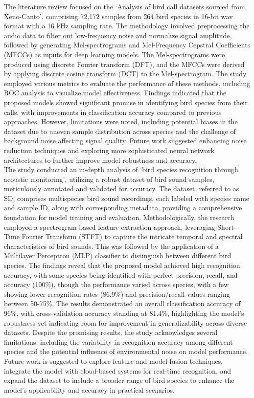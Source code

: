 The literature review focused on the `Analysis of bird call datasets sourced
from Xeno-Canto', comprising 72,172 samples from 264 bird species in 16-bit wav
format with a 16 kHz sampling rate. The methodology involved preprocessing the
audio data to filter out low-frequency noise and normalize signal amplitude,
followed by generating Mel-spectrograms and Mel-Frequency Cepstral Coefficients
(MFCCs) as inputs for deep learning models. The Mel-spectrograms were produced
using discrete Fourier transform (DFT), and the MFCCs were derived by applying
discrete cosine transform (DCT) to the Mel-spectrogram. The study employed
various metrics to evaluate the performance of these methods, including ROC
analysis to visualize model effectiveness. Findings indicated that the proposed
models showed significant promise in identifying bird species from their calls,
with improvements in classification accuracy compared to previous approaches.
However, limitations were noted, including potential biases in the dataset due
to uneven sample distribution across species and the challenge of background
noise affecting signal quality. Future work suggested enhancing noise reduction
techniques and exploring more sophisticated neural network architectures to
further improve model robustness and accuracy.\cite{wang2022efficient}\\

The study conducted an in-depth analysis of `bird species recognition through
acoustic monitoring', utilizing a robust dataset of bird sound samples,
meticulously annotated and validated for accuracy. The dataset, referred to as
SD, comprises multispecies bird sound recordings, each labeled with species
name and sample ID, along with corresponding metadata, providing a
comprehensive foundation for model training and evaluation. Methodologically,
the research employed a spectrogram-based feature extraction approach,
leveraging Short-Time Fourier Transform (STFT) to capture the intricate
temporal and spectral characteristics of bird sounds. This was followed by the
application of a Multilayer Perceptron (MLP) classifier to distinguish between
different bird species. The findings reveal that the proposed model achieved
high recognition accuracy, with some species being identified with perfect
precision, recall, and accuracy (100\%), though the performance varied across
species, with a few showing lower recognition rates (86.9\%) and
precision/recall values ranging between 50-75\%. The results demonstrated an
overall classification accuracy of 96\%, with cross-validation accuracy
standing at 81.4\%, highlighting the model's robustness yet indicating room for
improvement in generalizability across diverse datasets. Despite the promising
results, the study acknowledges several limitations, including the variability
in recognition accuracy among different species and the potential influence of
environmental noise on model performance. Future work is suggested to explore
feature and model fusion techniques, integrate the model with cloud-based
systems for real-time recognition, and expand the dataset to include a broader
range of bird species to enhance the model's applicability and accuracy in
practical scenarios.\cite{pahuja2021sound}\\ \\


